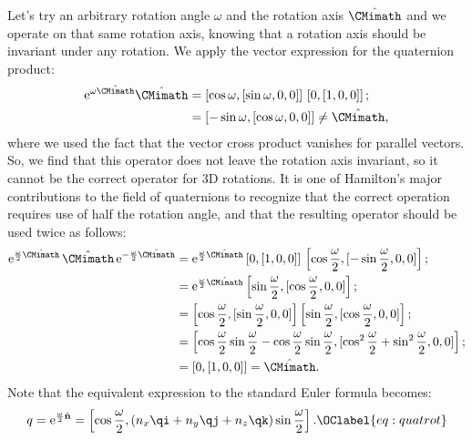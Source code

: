 Let's try an arbitrary rotation angle $\omega$ and the rotation axis $\hat{\CMimath}$ and we operate on that same rotation axis, knowing that a rotation axis should be invariant under any rotation.  We apply the vector expression for the quaternion product:
\begin{equation}
\begin{split}
	\mathrm{e}^{\omega \hat{\CMimath}} \hat{\CMimath} &= \left[\cos\omega,[\sin\omega,0,0]\right]\,\left[0,[1,0,0]\right];\\
	& = \left[-\sin\omega, [\cos\omega,0,0]\right] \ne \hat{\CMimath},
\end{split}
\end{equation}
where we used the fact that the vector cross product vanishes for parallel vectors.  So, we find that this operator does not leave the rotation axis invariant, so it cannot be the correct operator for 3D rotations.  It is one of Hamilton's major contributions to the field of quaternions to recognize that the correct operation requires use of half the rotation angle, and that the resulting operator should be used twice as follows:
\begin{equation}
\begin{split}
	\mathrm{e}^{\frac{\omega}{2} \hat{\CMimath}}\, \hat{\CMimath}\,\mathrm{e}^{-\frac{\omega}{2} \hat{\CMimath}} &=
	\mathrm{e}^{\frac{\omega}{2} \hat{\CMimath}} \left[0,[1,0,0]\right]\,\left[\cos\frac{\omega}{2},[-\sin\frac{\omega}{2},0,0]\right];\\
	&=\mathrm{e}^{\frac{\omega}{2} \hat{\CMimath}} \left[\sin\frac{\omega}{2},[\cos\frac{\omega}{2},0,0]\right];\\
	&= \left[\cos\frac{\omega}{2},[\sin\frac{\omega}{2},0,0]\right] \left[\sin\frac{\omega}{2},[\cos\frac{\omega}{2},0,0]\right];\\
	&=\left[ \cos\frac{\omega}{2}\sin\frac{\omega}{2}-\cos\frac{\omega}{2}\sin\frac{\omega}{2}, [ \cos^2\frac{\omega}{2}+ \sin^2\frac{\omega}{2},0,0]\right];\\
	&= \left[0,[1,0,0]\right] = \hat{\CMimath}.
\end{split}
\end{equation}
Note that the equivalent expression to the standard Euler formula becomes:
\begin{equation}
	q = \mathrm{e}^{\frac{\omega}{2} \hat{\mathbf{n}}} = \left[\cos\frac{\omega}{2},(n_x\qi+n_y \qj+n_z \qk)\sin\frac{\omega}{2}\right].\OClabel{eq:quatrot}
\end{equation}

